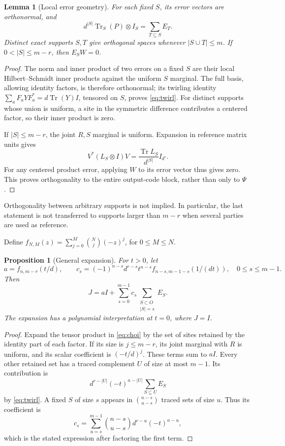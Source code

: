 \documentclass[11pt,a4paper]{article}
\newtheorem{lemma}[theorem]{Lemma}
\newtheorem{proposition}[theorem]{Proposition}
\newcommand{\Tr}{\operatorname{Tr}}
\begin{document}
\begin{lemma}[Local error geometry]\label{lem:error}
For each fixed \(S\), its error vectors are orthonormal, and
\begin{equation}\label{eq:twirl}
 d^{|S|}\Tr_S(P)\otimes I_S=\sum_{T\subseteq S}E_T.
\end{equation}
Distinct exact supports \(S,T\) give orthogonal spaces whenever
\(|S\cup T|\le m\). If \(0<|S|\le m-r\), then \(E_SW=0\).
\end{lemma}
\begin{proof}
The norm and inner product of two errors on a fixed \(S\) are their local Hilbert--Schmidt inner products against the uniform \(S\) marginal. The full basis, allowing identity factors, is therefore orthonormal; its twirling identity
\(\sum_aF_aYF_a^*=d\Tr(Y)I\), tensored on \(S\), proves \eqref{eq:twirl}. For distinct supports whose union is uniform, a site in the symmetric difference contributes a centered factor, so their inner product is zero.

If \(|S|\le m-r\), the joint \(R,S\) marginal is uniform. Expansion in reference matrix units gives
\[
 V^*(L_S\otimes I)V=\frac{\Tr L_S}{d^{|S|}}I_{d^r}.
\]
For any centered product error, applying \(W\) to its error vector thus gives zero. This proves orthogonality to the entire output-code block, rather than only to \(\Psi\).
\end{proof}
Orthogonality between arbitrary supports is not implied. In particular, the last statement is not transferred to supports larger than \(m-r\) when several parties are used as reference.

Define \(f_{N,M}(z)=\sum_{j=0}^M\binom Nj(-z)^j\), for \(0\le M\le N\).
\begin{proposition}[General expansion]\label{prop:exp}
For \(t>0\), let
\[
 a=f_{n,m-r}(t/d),\qquad
 c_s=(-1)^{n-s}d^{r-s}t^{n-s}
       f_{n-s,m-1-s}(1/(dt)),\quad 0\le s\le m-1.
\]
Then
\begin{equation}\label{eq:expansion}
 J=aI+\sum_{s=0}^{m-1}c_s\sum_{\substack{S\subset O\\|S|=s}}E_S.
\end{equation}
The expansion has a polynomial interpretation at \(t=0\), where \(J=I\).
\end{proposition}
\begin{proof}
Expand the tensor product in \eqref{eq:choi} by the set of sites retained by the identity part of each factor. If its size is \(j\le m-r\), its joint marginal with \(R\) is uniform, and its scalar coefficient is \((-t/d)^j\). These terms sum to \(aI\). Every other retained set has a traced complement \(U\) of size at most \(m-1\). Its contribution is
\[
 d^{r-|U|}(-t)^{n-|U|}\sum_{S\subseteq U}E_S
\]
by \eqref{eq:twirl}. A fixed \(S\) of size \(s\) appears in \(\binom{n-s}{u-s}\) traced sets of size \(u\). Thus its coefficient is
\[
 c_s=\sum_{u=s}^{m-1}\binom{n-s}{u-s}d^{r-u}(-t)^{n-u},
\]
which is the stated expression after factoring the first term.
\end{proof}
\end{document}
